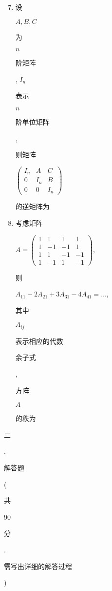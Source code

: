 \documentclass[10pt]{article}
\begin{document}
\begin{enumerate}
  \setcounter{enumi}{6}
  \item \begin{CJK}{UTF8}{mj}设\end{CJK} $A, B, C$ \begin{CJK}{UTF8}{mj}为\end{CJK} $n$ \begin{CJK}{UTF8}{mj}阶矩阵\end{CJK}, $I_{n}$ \begin{CJK}{UTF8}{mj}表示\end{CJK} $n$ \begin{CJK}{UTF8}{mj}阶单位矩阵\end{CJK}, \begin{CJK}{UTF8}{mj}则矩阵\end{CJK} $\left(\begin{array}{ccc}I_{n} & A & C \\ 0 & I_{n} & B \\ 0 & 0 & I_{n}\end{array}\right)$ \begin{CJK}{UTF8}{mj}的逆矩阵为\end{CJK}

  \item \begin{CJK}{UTF8}{mj}考虑矩阵\end{CJK} $A=\left(\begin{array}{cccc}1 & 1 & 1 & 1 \\ 1 & -1 & -1 & 1 \\ 1 & 1 & -1 & -1 \\ 1 & -1 & 1 & -1\end{array}\right)$, \begin{CJK}{UTF8}{mj}则\end{CJK} $A_{11}-2 A_{21}+3 A_{31}-4 A_{41}=\ldots$, \begin{CJK}{UTF8}{mj}其中\end{CJK} $A_{i j}$ \begin{CJK}{UTF8}{mj}表示相应的代数\end{CJK} \begin{CJK}{UTF8}{mj}余子式\end{CJK}, \begin{CJK}{UTF8}{mj}方阵\end{CJK} $A$ \begin{CJK}{UTF8}{mj}的秩为\end{CJK}

\end{enumerate}
\begin{CJK}{UTF8}{mj}二\end{CJK}. \begin{CJK}{UTF8}{mj}解答题\end{CJK}(\begin{CJK}{UTF8}{mj}共\end{CJK} 90 \begin{CJK}{UTF8}{mj}分\end{CJK}. \begin{CJK}{UTF8}{mj}需写出详细的解答过程\end{CJK})
\end{document}
